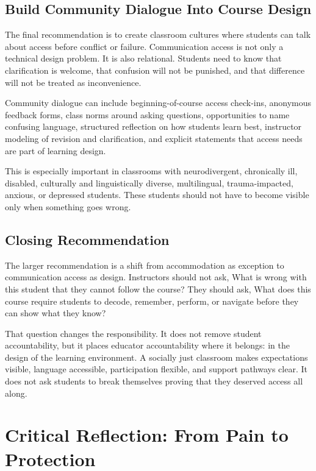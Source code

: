 \documentclass[12pt]{article}
\begin{document}
\subsection*{Build Community Dialogue Into Course Design}

The final recommendation is to create classroom cultures where students can talk about access before conflict or failure. Communication access is not only a technical design problem. It is also relational. Students need to know that clarification is welcome, that confusion will not be punished, and that difference will not be treated as inconvenience.

Community dialogue can include beginning-of-course access check-ins, anonymous feedback forms, class norms around asking questions, opportunities to name confusing language, structured reflection on how students learn best, instructor modeling of revision and clarification, and explicit statements that access needs are part of learning design.

This is especially important in classrooms with neurodivergent, chronically ill, disabled, culturally and linguistically diverse, multilingual, trauma-impacted, anxious, or depressed students. These students should not have to become visible only when something goes wrong.

\subsection*{Closing Recommendation}

The larger recommendation is a shift from accommodation as exception to communication access as design. Instructors should not ask, What is wrong with this student that they cannot follow the course? They should ask, What does this course require students to decode, remember, perform, or navigate before they can show what they know?

That question changes the responsibility. It does not remove student accountability, but it places educator accountability where it belongs: in the design of the learning environment. A socially just classroom makes expectations visible, language accessible, participation flexible, and support pathways clear. It does not ask students to break themselves proving that they deserved access all along.

\section*{Critical Reflection: From Pain to Protection}
\end{document}
